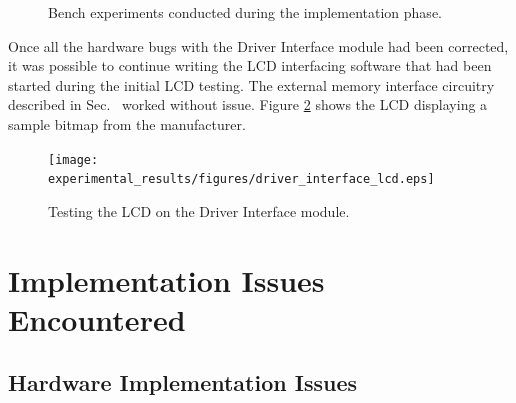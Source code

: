 \begin{figure}[h!]
\centering
{}
\caption{Bench experiments conducted during the implementation phase.}
\label{fig:bench_experiments}
\end{figure}

Once all the hardware bugs with the Driver Interface module had been corrected, it was possible to continue writing the LCD interfacing software that had been started during the initial LCD testing. The external memory interface circuitry described in Sec.\ \label{sec:lcd_module_data_interface} worked without issue. Figure \ref{fig:driver_interface_lcd} shows the LCD displaying a sample bitmap from the manufacturer.

\begin{figure}[h]
 \centering
 \texttt{[image: experimental\_results/figures/driver\_interface\_lcd.eps]}
 \caption{Testing the LCD on the Driver Interface module.}
 \label{fig:driver_interface_lcd}
\end{figure}

\section{Implementation Issues Encountered}


\subsection{Hardware Implementation Issues}


